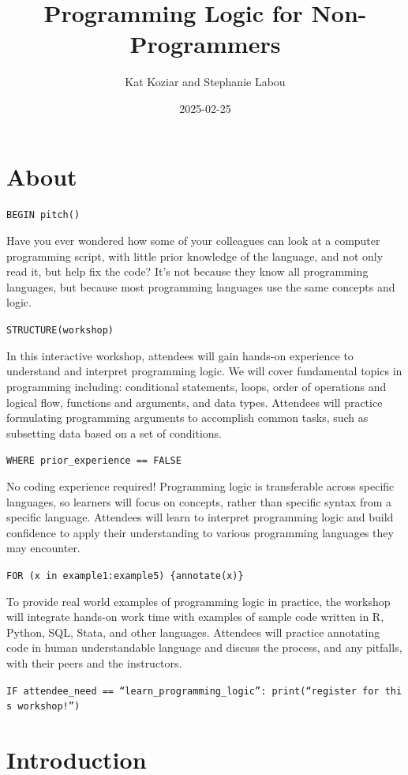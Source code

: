 \documentclass[
]{book}
\title{Programming Logic for Non-Programmers}
\author{Kat Koziar and Stephanie Labou}
\date{2025-02-25}
\begin{document}
\maketitle

{
\setcounter{tocdepth}{1}
\tableofcontents
}
\chapter{About}\label{about}

\texttt{BEGIN\ pitch()}

Have you ever wondered how some of your colleagues can look at a computer programming script, with little prior knowledge of the language, and not only read it, but help fix the code? It's not because they know all programming languages, but because most programming languages use the same concepts and logic.

\texttt{STRUCTURE(workshop)}

In this interactive workshop, attendees will gain hands-on experience to understand and interpret programming logic. We will cover fundamental topics in programming including: conditional statements, loops, order of operations and logical flow, functions and arguments, and data types. Attendees will practice formulating programming arguments to accomplish common tasks, such as subsetting data based on a set of conditions.

\texttt{WHERE\ prior\_experience\ ==\ FALSE}

No coding experience required! Programming logic is transferable across specific languages, so learners will focus on concepts, rather than specific syntax from a specific language. Attendees will learn to interpret programming logic and build confidence to apply their understanding to various programming languages they may encounter.

\texttt{FOR\ (x\ in\ example1:example5)\ \{annotate(x)\}}

To provide real world examples of programming logic in practice, the workshop will integrate hands-on work time with examples of sample code written in R, Python, SQL, Stata, and other languages. Attendees will practice annotating code in human understandable language and discuss the process, and any pitfalls, with their peers and the instructors.

\texttt{IF\ attendee\_need\ ==\ “learn\_programming\_logic”:\ print(“register\ for\ this\ workshop!”)}

\chapter{Introduction}\label{intro}
\end{document}
